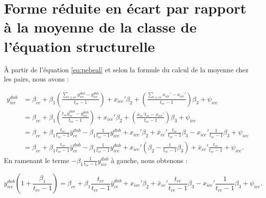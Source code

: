 \documentclass[
]{book}
\begin{document}
\setcounter{section}{0}

\renewcommand*{\theHchapter}{\thechapter}
\renewcommand*{\thesection}{\Alph{section}}
\renewcommand*{\theHsection}{Appendix.\thechapter\thesection}

\renewcommand*{\thetable}{\Alph{section}.\arabic{table}}
\renewcommand*{\theHtable}{Appendix.\thetable}

\renewcommand*{\thefigure}{\Alph{section}.\arabic{figure}}
\renewcommand*{\theHfigure}{Appendix.\thefigure}

\setcounter{table}{0}
\setcounter{figure}{0}

\hypertarget{pebealwithin}{%
\section{Forme réduite en écart par rapport à la moyenne de la classe de l'équation structurelle}\label{pebealwithin}}

À partir de l'équation \eqref{eq:pebeal} et selon la formule du calcul de la moyenne chez les pairs, nous avons :

\[
\begin{aligned}
y^{dnb}_{ice} &= \beta_{ce} + \beta_1 (\frac{\displaystyle\sum_{i \in ce} y^{dnb}_{ice} - y^{dnb}_{ice}}{t_{ce} - 1}) + x_{ice}' \beta_2 + (\frac{\displaystyle\sum_{i \in ce} x_{ice}' - x_{ice}'}{t_{ce} - 1}) \beta_3 + \psi_{ice} \\
&= \beta_{ce} + \beta_1 (\frac{t_{ce} \bar{y}^{dnb}_{ce} - y^{dnb}_{ice}}{t_{ce} - 1}) + x_{ice}' \beta_2 + (\frac{\bar{x}_{ce}'t_{ce} - x_{ice}'}{t_{ce} - 1}) \beta_3 + \psi_{ice} \\
&= \beta_{ce} + \beta_1 \frac{t_{ce}}{t_{ce} - 1}  \bar{y}^{dnb}_{ce} - \beta_1 \frac{1}{t_{ce} - 1}y^{dnb}_{ice} + x_{ice}' \beta_2 + \bar{x}_{ce}' \frac{t_{ce}}{t_{ce} - 1} \beta_3 - x_{ice}' \frac{1}{t_{ce} - 1} \beta_3 + \psi_{ice} \\
&= \beta_{ce} + \beta_1 \frac{t_{ce}}{t_{ce} - 1} \bar{y}^{dnb}_{ce} - \beta_1 \frac{1}{t_{ce} - 1} y^{dnb}_{ice} + x_{ice}' (\beta_2 - \frac{1}{t_{ce} - 1} \beta_3) + \bar{x}_{ce}' \frac{t_{ce}}{t_{ce} - 1} + \psi_{ice}.
\end{aligned}
\]
En ramenant le terme \(- \beta_1 \frac{1}{t_{ce} - 1} y^{dnb}_{ice}\) à gauche, nous obtenons :

\begin{equation}
\label{eq:pebealwithin1}
y^{dnb}_{ice} (1 + \frac{\beta_1}{t_{ce} - 1}) = \beta_{ce} + \beta_1 \frac{t_{ce}}{t_{ce} - 1}  \bar{y}^{dnb}_{ce} + x_{ice}' \beta_2 + \bar{x}_{ce}' \frac{t_{ce}}{t_{ce} - 1} \beta_3 - x_{ice}' \frac{1}{t_{ce} - 1} \beta_3 + \psi_{ice}.
\end{equation}
\end{document}
